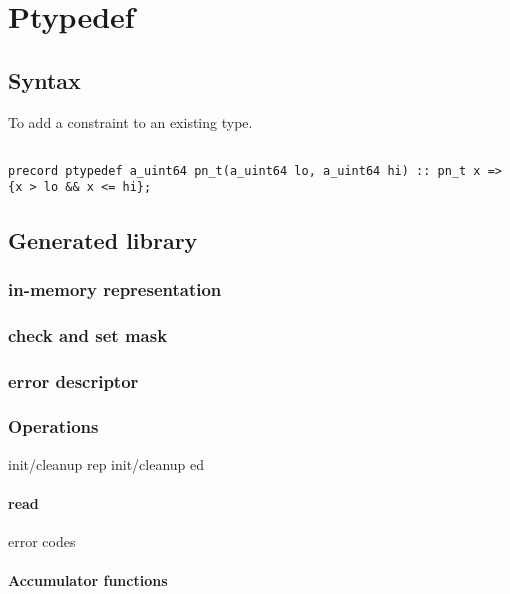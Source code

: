 \chapter{Ptypedef}
\label{chap:typedef}
\section{Syntax}
To add a constraint to an existing type.
\begin{verbatim}

precord ptypedef a_uint64 pn_t(a_uint64 lo, a_uint64 hi) :: pn_t x => {x > lo && x <= hi};

\end{verbatim}


\section{Generated library}
\subsection{in-memory representation}
\subsection{check and set mask}
\subsection{error descriptor}
\subsection{Operations}
init/cleanup rep
init/cleanup ed
\subsubsection{read}
  error codes
\subsubsection{Accumulator functions}

